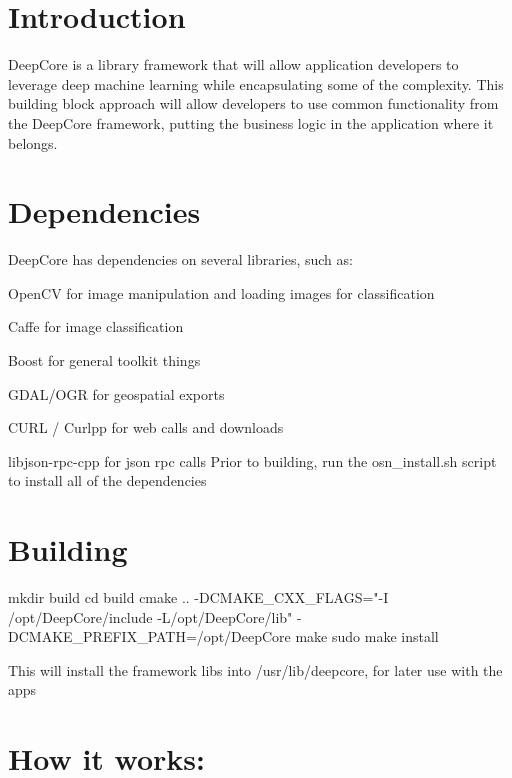 \hypertarget{index_intro_sec}{}\section{Introduction}\label{index_intro_sec}
Deep\+Core is a library framework that will allow application developers to leverage deep machine learning while encapsulating some of the complexity. This building block approach will allow developers to use common functionality from the Deep\+Core framework, putting the business logic in the application where it belongs.\hypertarget{index_dependencies_sec}{}\section{Dependencies}\label{index_dependencies_sec}
Deep\+Core has dependencies on several libraries, such as\+:
\begin{DoxyItemize}
\item Open\+CV for image manipulation and loading images for classification
\item Caffe for image classification
\item Boost for general toolkit things
\item G\+D\+A\+L/\+O\+GR for geospatial exports
\item C\+U\+RL / Curlpp for web calls and downloads
\item libjson-\/rpc-\/cpp for json rpc calls Prior to building, run the osn\+\_\+install.\+sh script to install all of the dependencies
\end{DoxyItemize}\hypertarget{index_building_sec}{}\section{Building}\label{index_building_sec}

\begin{DoxyPre}
mkdir build
cd build
cmake .. -DCMAKE\_CXX\_FLAGS="-I /opt/DeepCore/include -L/opt/DeepCore/lib" -DCMAKE\_PREFIX\_PATH=/opt/DeepCore
make
sudo make install
\end{DoxyPre}
 This will install the framework libs into /usr/lib/deepcore, for later use with the apps\hypertarget{index_howitworks_sec}{}\section{How it works\+:}\label{index_howitworks_sec}
 